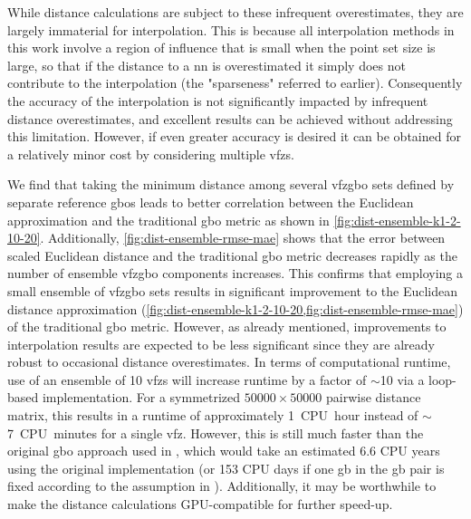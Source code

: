 \documentclass[preprint,12pt]{elsarticle}
\begin{document}
While distance calculations are subject to these infrequent overestimates, they are largely immaterial for interpolation. This is because all interpolation methods in this work involve a region of influence that is small when the point set size is large, so that if the distance to a \gls{nn} is overestimated it simply does not contribute to the interpolation (the "sparseness" referred to earlier). Consequently the accuracy of the interpolation is not significantly impacted by infrequent distance overestimates, and excellent results can be achieved without addressing this limitation. However, if even greater accuracy is desired it can be obtained for a relatively minor cost by considering multiple \glspl{vfz}.

We find that taking the minimum distance among several \gls{vfzgbo} sets defined by separate reference \glspl{gbo} leads to better correlation between the Euclidean approximation and the traditional \gls{gbo} metric as shown in \cref{fig:dist-ensemble-k1-2-10-20}. Additionally, \cref{fig:dist-ensemble-rmse-mae} shows that the error between scaled Euclidean distance and the traditional \gls{gbo} metric decreases rapidly as the number of ensemble \gls{vfzgbo} components increases. This confirms that employing a small ensemble of \gls{vfzgbo} sets results in significant improvement to the Euclidean distance approximation (\cref{fig:dist-ensemble-k1-2-10-20,fig:dist-ensemble-rmse-mae}) of the traditional \gls{gbo} metric. However, as already mentioned, improvements to interpolation results are expected to be less significant since they are already robust to occasional distance overestimates. In terms of computational runtime, use of an ensemble of 10 \glspl{vfz} will increase runtime by a factor of $\sim$10 via a loop-based implementation. For a symmetrized $\num{50000}\times\num{50000}$ pairwise distance matrix, this results in a runtime of approximately 1~CPU~hour instead of $\sim$7~CPU~minutes for a single \gls{vfz}. However, this is still much faster than the original \gls{gbo} approach used in \cite{chesserLearningGrainBoundary2020}, which would take an estimated 6.6 CPU years using the original implementation (or 153 CPU days if one \gls{gb} in the \gls{gb} pair is fixed according to the assumption in \citet{morawiecDistancesGrainInterfaces2019}). Additionally, it may be worthwhile to make the distance calculations GPU-compatible for further speed-up. %
\end{document}
